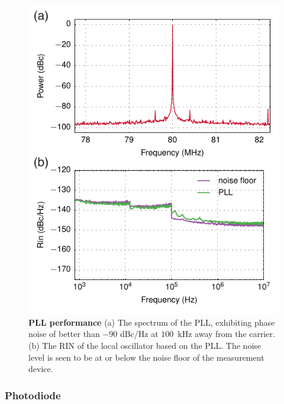 \documentclass[twocolumn,aps,pra,showpacs,preprintnumbers,bibnotes]{revtex4-1}
\begin{document}
\begin{figure}
  \begin{center}
    \includegraphics{fig/pll.pdf}
    \caption{\textbf{PLL performance} (a) The spectrum of the PLL, exhibiting phase noise of better than $-90$ dBc/Hz at $100$~kHz away from the carrier. (b) The RIN of the local oscillator based on the PLL. The noise level is seen to be at or below the noise floor of the measurement device.}\label{fig:pll}
  \end{center}
\end{figure}

\subsubsection{Photodiode}
\end{document}

